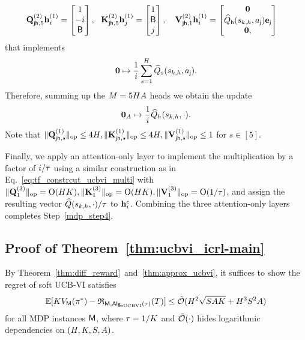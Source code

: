 \begin{align*}
  & {\mathbf Q}_{{\mathsf{j}}{\mathsf{h}},5}^{(2)}{\mathbf h}_i^{(1)} =\begin{bmatrix}
       1\\-i\\
       {\mathsf{B}}
   \end{bmatrix},~~ {\mathbf K}_{{\mathsf{j}}{\mathsf{h}},5}^{(2)}{\mathbf h}_j^{(1)} =\begin{bmatrix}
    1 \\{\mathsf{B}}\\ j
   \end{bmatrix},~~~
   {\mathbf V}_{{\mathsf{j}}{\mathsf{h}},1}^{(2)}{\mathbf h}_i^{(1)} =\begin{bmatrix}
       {\mathbf 0} \\  {\widehat{{Q}}}_{\mathsf{h}}({s}_{k,h},{a}_{\mathsf{j}}){\mathbf e}_{{\mathsf{j}}}\\
       {\mathbf 0},
   \end{bmatrix}
\end{align*} that implements
\begin{align*}
    {\mathbf 0}\mapsto \frac{1}{i}\sum_{s=1}^{{H}}{{\widehat{{Q}}}_{s}({s}_{k,h},{a}_{\mathsf{j}})}.
\end{align*}
Therefore, summing up the ${M}=5{H}{A}$ heads we obtain the update
\begin{align*}
  {\mathbf 0}_{{A}}\mapsto \frac{1}{i}{\widehat{{Q}}}_{h}({s}_{k,h},\cdot).
\end{align*}
Note that $\|{{\mathbf Q}_{{\mathsf{j}}{\mathsf{h}},s}^{(1)}}\|_{\mathrm{op}}\leq4{H},\|{{\mathbf K}_{{\mathsf{j}}{\mathsf{h}},s}^{(1)}}\|_{\mathrm{op}}\leq4{H},\|{{\mathbf V}_{{\mathsf{j}}{\mathsf{h}},s}^{(1)}}\|_{\mathrm{op}}\leq1$ for $s\in[5]$.

Finally, we apply an attention-only layer to implement the multiplication by a factor of $i/{\tau}$ using a similar construction as in Eq.~\eqref{eq:tf_constrcut_ucbvi_multi} with $\|{{\mathbf Q}_1^{(3)}}\|_{\mathrm{op}}={\mathrm{O}}({H}{K}),\|{{\mathbf K}_1^{(3)}}\|_{\mathrm{op}}={\mathrm{O}}({H}{K}),\|{{\mathbf V}_1^{(3)}}\|_{\mathrm{op}}={\mathrm{O}}(1/{\tau})$, and assign the resulting vector ${\widehat{{Q}}}({s}_{k,h},\cdot)/{\tau}$ to ${\mathbf h}_i^{c}$. 
Combining the three attention-only layers completes Step~\ref{mdp_step4}.





















\subsection{Proof of Theorem~\ref{thm:ucbvi_icrl-main}}\label{sec:pf_thm:ucbvi_icrl-main}
By Theorem~\ref{thm:diff_reward}~and~\ref{thm:approx_ucbvi}, it suffices to show the regret of soft UCB-VI satisfies
\begin{align*}
\mathbb{E}[{K}{{V}}_{\mathsf{M}}({\pi}^*)-{\mathfrak{R}}_{{\mathsf{M}},{\mathsf{Alg}}_{\mathrm{sUCBVI}}({\tau})}({T})]\leq {\tilde{\mathcal O}} ({H}^2\sqrt{{S}{A}{K}}+{H}^3{S}^2{A})
\end{align*} for all MDP instances ${\mathsf{M}}$, where ${\tau}=1/{K}$ and ${\tilde{\mathcal O}}(\cdot)$ hides logarithmic dependencies on $({H},{K},{S},{A})$. 


